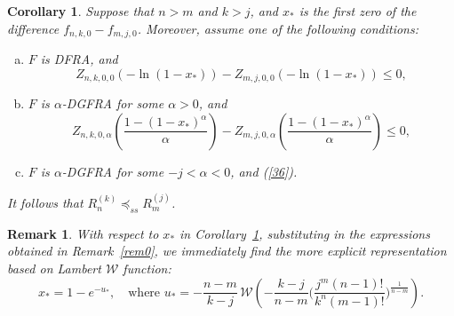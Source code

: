 \documentclass [11pt]{article}
\newtheorem{remark}{Remark}
\newtheorem{corollary}{Corollary}
\newcommand{\correction}[2]{\textcolor{violet}{#1}\textcolor{blue}{#2}}
\begin{document}
\begin{corollary}\label{cor3}
Suppose that $n>m$ and $k>j$, and $x_*$ is the first zero of the difference $f_{n,k,0} -f_{m,j,0}$. %
Moreover, assume one of the following conditions:
    \begin{enumerate}[(a)]
    \item
    $F$ is DFRA, 
    and
    \begin{equation}
    \label{35}
    Z_{n,k,0,0}(-\ln(1-x_*)) - Z_{m,j,0,0}(-\ln(1-x_*)) \leq 0,
    \end{equation}

    \item
    $F$ is $\alpha$-DGFRA for some $\alpha >0$, 
    and
    \begin{equation}
    \label{36}
    Z_{n,k,0,\alpha}\left(  \frac{1-(1-x_*)^\alpha}{\alpha}\right) -
    Z_{m,j,0,\alpha}\left(  \frac{1-(1-x_*)^\alpha}{\alpha}\right)
    \leq 0,
    \end{equation}

    \item $F$ is $\alpha$-DGFRA for some $-j <\alpha < 0$,  and 
    (\ref{36}). %
    \end{enumerate}
It follows that   $R_n^{(k)} \preceq_{ss} R_m^{(j)}$.
\end{corollary}

\begin{remark}
With respect to $x_*$ in Corollary~\ref{cor3}, substituting in the expressions obtained in Remark~\ref{rem0}, we immediately find the more explicit representation based on Lambert $\mathcal{W}$ function:
$$
x_*=1-e^{-u_*}, \quad\text{where }u_*= -\frac{n-m}{k-j}\,\mathcal W\!\left(-\frac{k-j}{n-m}\bigg(\frac{j^m(n-1)!}{k^n(m-1)!}\bigg)^{\tfrac 1{n-m}}\right).
$$
\end{remark}
\end{document}

